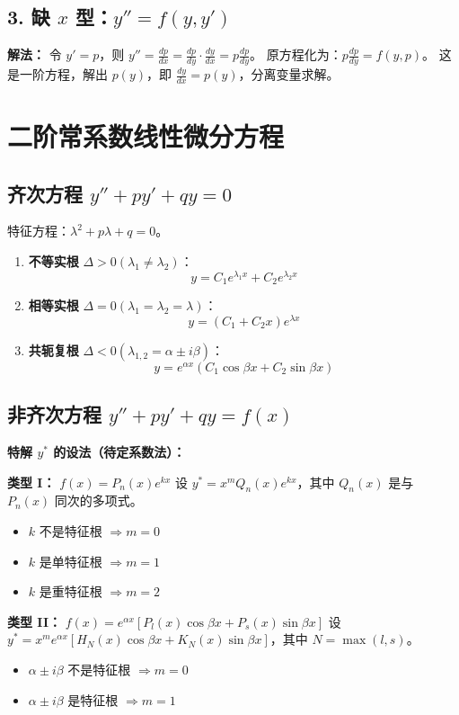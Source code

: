 \documentclass[a4paper,12pt]{ctexart}
\newenvironment{rednote}
  {\begin{tcolorbox}[colback=notepurple, colframe=highlightred, boxrule=1pt, title=\textbf{重点/技巧/手写笔记}]}
  {\end{tcolorbox}}
\begin{document}
\subsection{3. 缺 $x$ 型：$y'' = f(y, y')$}
\textbf{解法：} 令 $y' = p$，则 $y'' = \frac{dp}{dx} = \frac{dp}{dy} \cdot \frac{dy}{dx} = p \frac{dp}{dy}$。
原方程化为：$p \frac{dp}{dy} = f(y, p)$。
这是一阶方程，解出 $p(y)$，即 $\frac{dy}{dx} = p(y)$，分离变量求解。

\section{二阶常系数线性微分方程}

\subsection{齐次方程 $y'' + py' + qy = 0$}
特征方程：$\lambda^2 + p\lambda + q = 0$。

\begin{enumerate}
    \item \textbf{不等实根} $\Delta > 0 (\lambda_1 \neq \lambda_2)$：
    \[ y = C_1 e^{\lambda_1 x} + C_2 e^{\lambda_2 x} \]
    \item \textbf{相等实根} $\Delta = 0 (\lambda_1 = \lambda_2 = \lambda)$：
    \[ y = (C_1 + C_2 x) e^{\lambda x} \]
    \item \textbf{共轭复根} $\Delta < 0 (\lambda_{1,2} = \alpha \pm i\beta)$：
    \[ y = e^{\alpha x} (C_1 \cos \beta x + C_2 \sin \beta x) \]
\end{enumerate}

\subsection{非齐次方程 $y'' + py' + qy = f(x)$}
\textbf{特解 $y^*$ 的设法（待定系数法）：}

\begin{rednote}
    \textbf{类型 I：} $f(x) = P_n(x) e^{kx}$
    设 $y^* = x^m Q_n(x) e^{kx}$，其中 $Q_n(x)$ 是与 $P_n(x)$ 同次的多项式。
    \begin{itemize}
        \item $k$ 不是特征根 $\Rightarrow m=0$
        \item $k$ 是单特征根 $\Rightarrow m=1$
        \item $k$ 是重特征根 $\Rightarrow m=2$
    \end{itemize}

    \textbf{类型 II：} $f(x) = e^{\alpha x} [P_l(x) \cos \beta x + P_s(x) \sin \beta x]$
    设 $y^* = x^m e^{\alpha x} [H_N(x) \cos \beta x + K_N(x) \sin \beta x]$，其中 $N = \max(l, s)$。
    \begin{itemize}
        \item $\alpha \pm i\beta$ 不是特征根 $\Rightarrow m=0$
        \item $\alpha \pm i\beta$ 是特征根 $\Rightarrow m=1$
    \end{itemize}
\end{rednote}
\end{document}
